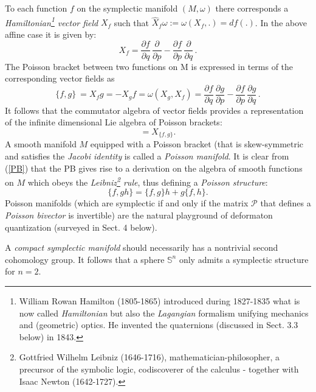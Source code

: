 \documentclass[12pt]{article}
\begin{document}
To each function $f$ on the symplectic manifold $(M, \omega)$
there corresponds a {\it Hamiltonian\footnote{William Rowan Hamilton (1805-1865)
introduced during 1827-1835 what is now called {\it Hamiltonian} but also the
{\it Lagangian} formalism unifying mechanics and (geometric) optics. He invented 
the quaternions (discussed in Sect. 3.3 below) in 1843.} vector field} 
$X_f$ such that $\hat{X}_f\omega := \omega(X_f, .) = df(.)$. In the above affine
 case it is given by:
\begin{equation}
X_f = \frac{\partial f}{\partial q} \, \frac{\partial}{\partial p} -
\frac{\partial f}{\partial p} \, \frac{\partial}{\partial q} \, .
\end{equation}
The Poisson bracket between two functions on M is expressed in terms of the
corresponding vector fields as
\begin{equation}
\label{PB}
\{f , g\}\ = X_f g = -X_g f = \omega(X_g, X_f) = \frac{\partial f}{\partial q} \, \frac{\partial g}{\partial p} - \frac{\partial f}{\partial p} \, \frac{\partial g}{\partial q} \, .
\end{equation}
It follows that the commutator algebra of vector fields provides a representation
of the infinite dimensional Lie algebra of Poisson brackets:
\begin{equation}
 [X_f, X_g] = X_{\{f , g\}}.
\end{equation}
A smooth manifold $M$ equipped with a Poisson bracket (that is skew-symmetric and satisfies the {\it Jacobi identity} is called
a {\it Poisson manifold}. It is clear from (\ref{PB}) that the PB gives rise to a derivation on the algebra of smooth functions 
on $M$ which obeys the {\it Leibniz\footnote{Gottfried Wilhelm Leibniz (1646-1716), mathematician-philosopher, a precursor of the symbolic logic, codiscoverer of the calculus - together with Isaac Newton (1642-1727).} rule}, thus defining a {\it Poisson structure}:
\begin{equation}
\label{Leib}
\{f, gh\} = \{f, g\} h + g\{f, h\}. 
\end{equation}
Poisson manifolds (which are symplectic if and only if the matrix ${\mathcal P}$ that defines a {\it Poisson bivector} is
invertible) are the natural playground of deformaton quantization (surveyed in Sect. 4 below).
 
A {\it compact symplectic manifold} should necessarily has a nontrivial second cohomology 
group. It follows that a sphere ${\mathbb S}^n$ only admits a symplectic 
structure for $n = 2$. 
\end{document}
